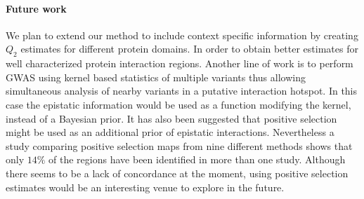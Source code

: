 \paragraph{Future work}
We plan to extend our method to include context specific information by creating $Q_2$ estimates for different protein domains. 
In order to obtain better estimates for well characterized protein interaction regions. 
Another line of work is to perform GWAS using kernel based statistics of multiple variants \cite{wu2011rare} thus allowing simultaneous analysis of nearby variants in a putative interaction hotspot. 
In this case the epistatic information would be used as a function modifying the kernel, instead of a Bayesian prior.
It has also been suggested that positive selection might be used as an additional prior of epistatic interactions. 
Nevertheless a study comparing positive selection maps from nine different methods \cite{akey2009constructing} shows that only $14\%$ of the regions have been identified in more than one study.
Although there seems to be a lack of concordance at the moment, using positive selection estimates would be an interesting venue to explore in the future.
